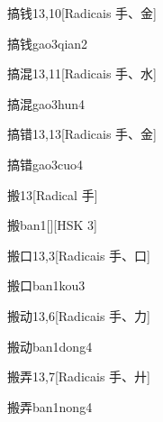 \begin{entry}{搞钱}{13,10}[Radicais ⼿、⾦]
  \begin{phonetics}{搞钱}{gao3qian2}
  \end{phonetics}
\end{entry}

\begin{entry}{搞混}{13,11}[Radicais ⼿、⽔]
  \begin{phonetics}{搞混}{gao3hun4}
  \end{phonetics}
\end{entry}

\begin{entry}{搞错}{13,13}[Radicais ⼿、⾦]
  \begin{phonetics}{搞错}{gao3cuo4}
  \end{phonetics}
\end{entry}

\begin{entry}{搬}{13}[Radical ⼿]
  \begin{phonetics}{搬}{ban1}[][HSK 3]
  \end{phonetics}
\end{entry}

\begin{entry}{搬口}{13,3}[Radicais ⼿、⼝]
  \begin{phonetics}{搬口}{ban1kou3}
  \end{phonetics}
\end{entry}

\begin{entry}{搬动}{13,6}[Radicais ⼿、⼒]
  \begin{phonetics}{搬动}{ban1dong4}
  \end{phonetics}
\end{entry}

\begin{entry}{搬弄}{13,7}[Radicais ⼿、⼶]
  \begin{phonetics}{搬弄}{ban1nong4}
  \end{phonetics}
\end{entry}

